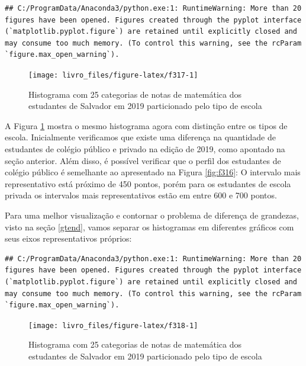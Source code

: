 \documentclass[
  oneside]{book}
\begin{document}
\begin{verbatim}
## C:/ProgramData/Anaconda3/python.exe:1: RuntimeWarning: More than 20 figures have been opened. Figures created through the pyplot interface (`matplotlib.pyplot.figure`) are retained until explicitly closed and may consume too much memory. (To control this warning, see the rcParam `figure.max_open_warning`).
\end{verbatim}

\begin{figure}

{\centering \texttt{[image: livro\_files/figure-latex/f317-1]} 

}

\caption{Histograma com 25 categorias de notas de matemática dos estudantes de Salvador em 2019 particionado pelo tipo de escola}\label{fig:f317}
\end{figure}

A Figura \ref{fig:f317} mostra o mesmo histograma agora com distinção entre os tipos de escola. Inicialmente verificamos que existe uma diferença na quantidade de estudantes de colégio público e privado na edição de 2019, como apontado na seção anterior. Além disso, é possível verificar que o perfil dos estudantes de colégio público é semelhante ao apresentado na Figura \ref{fig:f316}: O intervalo mais representativo está próximo de 450 pontos, porém para os estudantes de escola privada os intervalos mais representativos estão em entre 600 e 700 pontos.

Para uma melhor visualização e contornar o problema de diferença de grandezas, visto na seção \ref{gtend}, vamos separar os histogramas em diferentes gráficos com seus eixos representativos próprios:

\begin{verbatim}
## C:/ProgramData/Anaconda3/python.exe:1: RuntimeWarning: More than 20 figures have been opened. Figures created through the pyplot interface (`matplotlib.pyplot.figure`) are retained until explicitly closed and may consume too much memory. (To control this warning, see the rcParam `figure.max_open_warning`).
\end{verbatim}

\begin{figure}

{\centering \texttt{[image: livro\_files/figure-latex/f318-1]} 

}

\caption{Histograma com 25 categorias de notas de matemática dos estudantes de Salvador em 2019 particionado pelo tipo de escola}\label{fig:f318}
\end{figure}
\end{document}
